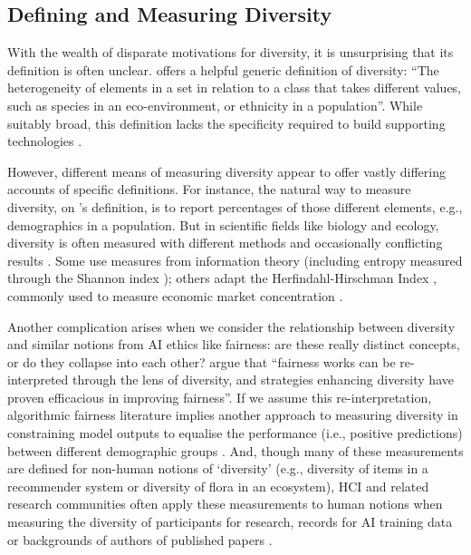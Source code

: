 \subsection{Defining and Measuring Diversity}
With the wealth of disparate motivations for diversity, it is unsurprising that its definition is often unclear. \textcite{page_diversity_2010} offers a helpful generic definition of diversity: ``The heterogeneity of elements in a set in relation to a class that takes different values, such as species in an eco-environment, or ethnicity in a population''. While suitably broad, this definition lacks the specificity required to build supporting technologies \cite{hupont2021diverse,page_diversity_2010}. 

However, different means of measuring diversity appear to offer vastly differing accounts of specific definitions. For instance, the natural way to measure diversity, on \textcite{page_diversity_2010}'s definition, is to report percentages of those different elements, e.g., demographics in a population. But in scientific fields like biology and ecology, diversity is often measured with different methods and occasionally conflicting results \cite{xu2020diversity}. Some use measures from information theory (including entropy measured through the Shannon index \cite{shannon1948mathematical}); others adapt the Herfindahl-Hirschman Index \cite{rhoades1993herfindahl}, commonly used to measure economic market concentration \cite{budescu2012measure,acuna2021ai,shannon1948mathematical,rhoades1993herfindahl}.

Another complication arises when we consider the relationship between diversity and similar notions from AI ethics like fairness: are these really distinct concepts, or do they collapse into each other?
\textcite{zhao2023fairness} argue that ``fairness works can be re-interpreted through the lens of diversity, and strategies enhancing diversity have proven efficacious in improving fairness''. If we assume this re-interpretation, algorithmic fairness literature implies another approach to measuring diversity in constraining model outputs to equalise the performance (i.e., positive predictions) between different demographic groups \cite{barocas2023fairness}. And, though many of these measurements are defined for non-human notions of `diversity' (e.g., diversity of items in a recommender system or diversity of flora in an ecosystem), HCI and related research communities often apply these measurements to human notions when measuring the diversity of participants for research, records for AI training data or backgrounds of authors of published papers \cite{linxen2021weird,himmelsbach2019we,zhao2024position,rojas2022dollar,acuna2021ai}. 

